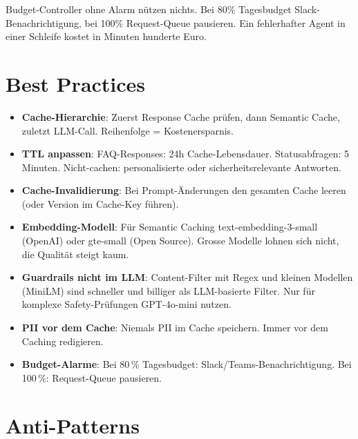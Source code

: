 \begin{praxishinweis}
Budget-Controller ohne Alarm nützen nichts. Bei 80\% Tagesbudget Slack-Benachrichtigung, bei 100\% Request-Queue pausieren. Ein fehlerhafter Agent in einer Schleife kostet in Minuten hunderte Euro.
\end{praxishinweis}

\section{Best Practices}

\begin{itemize}[leftmargin=*]
    \item \textbf{Cache-Hierarchie}: Zuerst Response Cache prüfen, dann Semantic Cache, zuletzt LLM-Call. Reihenfolge = Kostenersparnis.
    \item \textbf{TTL anpassen}: FAQ-Responses: 24h Cache-Lebensdauer. Statusabfragen: 5 Minuten. Nicht-cachen: personalisierte oder sicherheitsrelevante Antworten.
    \item \textbf{Cache-Invalidierung}: Bei Prompt-Änderungen den gesamten Cache leeren (oder Version im Cache-Key führen).
    \item \textbf{Embedding-Modell}: Für Semantic Caching text-embedding-3-small (OpenAI) oder gte-small (Open Source). Grosse Modelle lohnen sich nicht, die Qualität steigt kaum.
    \item \textbf{Guardrails nicht im LLM}: Content-Filter mit Regex und kleinen Modellen (MiniLM) sind schneller und billiger als LLM-basierte Filter. Nur für komplexe Safety-Prüfungen GPT-4o-mini nutzen.
    \item \textbf{PII vor dem Cache}: Niemals PII im Cache speichern. Immer vor dem Caching redigieren.
    \item \textbf{Budget-Alarme}: Bei 80\,\% Tagesbudget: Slack/Teams-Benachrichtigung. Bei 100\,\%: Request-Queue pausieren.
\end{itemize}

\section{Anti-Patterns}

